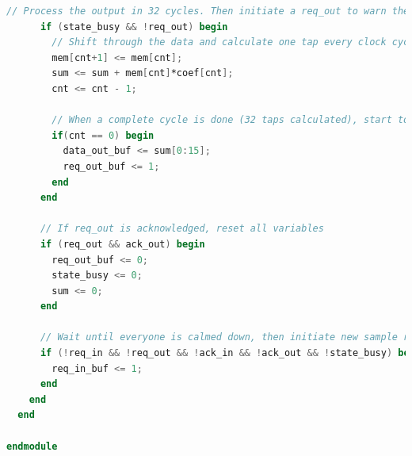 \documentclass[a4paper,twoside,11pt, fleqn]{article}
\begin{document}
\begin{lstlisting}[language=Verilog]
      // Process the output in 32 cycles. Then initiate a req_out to warn the output that a sample is ready
      if (state_busy && !req_out) begin
        // Shift through the data and calculate one tap every clock cycle
        mem[cnt+1] <= mem[cnt];
        sum <= sum + mem[cnt]*coef[cnt];
        cnt <= cnt - 1;

        // When a complete cycle is done (32 taps calculated), start to output the outcome
        if(cnt == 0) begin
          data_out_buf <= sum[0:15];
          req_out_buf <= 1;
        end
      end

      // If req_out is acknowledged, reset all variables
      if (req_out && ack_out) begin
        req_out_buf <= 0;
        state_busy <= 0;
        sum <= 0;
      end

      // Wait until everyone is calmed down, then initiate new sample request
      if (!req_in && !req_out && !ack_in && !ack_out && !state_busy) begin   
        req_in_buf <= 1;
      end	
    end
  end

endmodule
\end{lstlisting}
\end{document}
